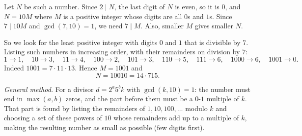 Let $N$ be such a number. Since $2\mid N$, the last digit of $N$ is even, so it is $0$, and $N=10M$ where $M$ is a positive integer whose digits are all $0$s and $1$s. Since $7\mid 10M$ and $\gcd(7,10)=1$, we need $7\mid M$. Also, smaller $M$ gives smaller $N$.

So we look for the least positive integer with digits $0$ and $1$ that is divisible by $7$. Listing such numbers in increasing order, with their remainders on division by $7$:
\[1\to1,\quad 10\to3,\quad 11\to4,\quad 100\to2,\quad 101\to3,\quad 110\to5,\quad 111\to6,\quad 1000\to6,\quad 1001\to0 .\]
Indeed $1001=7\cdot11\cdot13$. Hence $M=1001$ and
\[N=\boxed{10010}=14\cdot715 .\]

\emph{General method.} For a divisor $d=2^a5^bk$ with $\gcd(k,10)=1$: the number must end in $\max(a,b)$ zeros, and the part before them must be a $0$-$1$ multiple of $k$. That part is found by listing the remainders of $1,10,100,\dots$ modulo $k$ and choosing a set of these powers of $10$ whose remainders add up to a multiple of $k$, making the resulting number as small as possible (few digits first).
